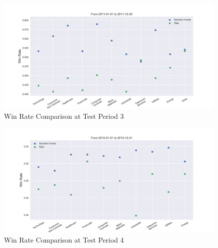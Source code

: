 \documentclass[12pt]{article}
\begin{document}
\begin{figure}[!ht]
  \begin{center}
    \includegraphics[width=1\linewidth]{figure/rf_raw_win_rate_time_2.png}
  \end{center}
  \caption{Win Rate Comparison at Test Period 3}
  \label{fig:rf_raw_win_rate_time_3}
\end{figure}

\begin{figure}[!ht]
  \begin{center}
    \includegraphics[width=1\linewidth]{figure/rf_raw_win_rate_time_3.png}
  \end{center}
  \caption{Win Rate Comparison at Test Period 4}
  \label{fig:rf_raw_win_rate_time_4}
\end{figure}

\renewcommand{\refname}{Reference} %
\printbibliography
\end{document}
